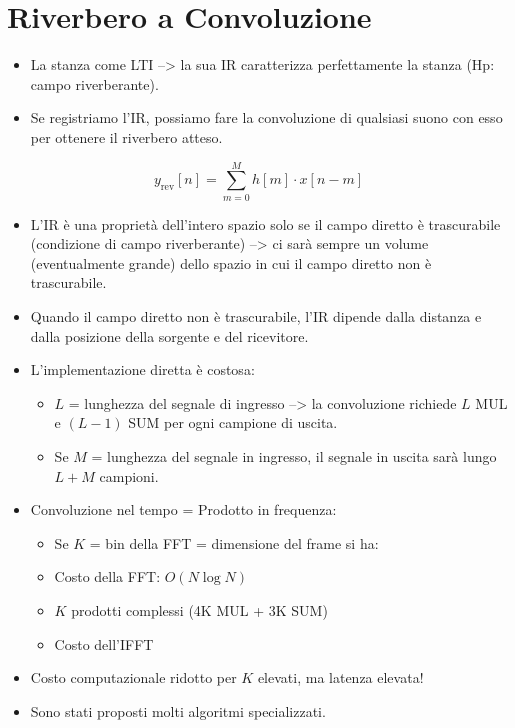 \section{Riverbero a Convoluzione}

\begin{itemize}
    \item La stanza come LTI --> la sua IR caratterizza perfettamente la stanza (Hp: campo riverberante).
    \item Se registriamo l'IR, possiamo fare la convoluzione di qualsiasi suono con esso per ottenere il riverbero atteso.
\end{itemize}
\[
    y_{\text{rev}}[n] = \sum_{m=0}^{M} h[m] \cdot x[n - m]
\]


\begin{itemize}
    \item L'IR è una proprietà dell'intero spazio solo se il campo diretto è trascurabile (condizione di campo riverberante) --> ci sarà sempre un volume (eventualmente grande) dello spazio in cui il campo diretto non è trascurabile.
    \item Quando il campo diretto non è trascurabile, l'IR dipende dalla distanza e dalla posizione della sorgente e del ricevitore.
\end{itemize}


\begin{itemize}
    \item L'implementazione diretta è costosa:
    \begin{itemize}
        \item $L$ = lunghezza del segnale di ingresso --> la convoluzione richiede $L$ MUL e $(L-1)$ SUM per ogni campione di uscita.
        \item Se $M$ = lunghezza del segnale in ingresso, il segnale in uscita sarà lungo $L+M$ campioni.
    \end{itemize}
    \item Convoluzione nel tempo = Prodotto in frequenza:
    \begin{itemize}
        \item Se $K$ = bin della FFT = dimensione del frame si ha:
        \item Costo della FFT: $O(N \log N)$
        \item $K$ prodotti complessi (4K MUL + 3K SUM)
        \item Costo dell'IFFT
    \end{itemize}
    \item Costo computazionale ridotto per $K$ elevati, ma latenza elevata!
    \item Sono stati proposti molti algoritmi specializzati.
\end{itemize}

